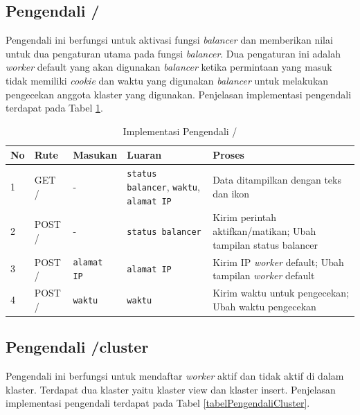 \documentclass{ta-its}
\begin{document}
			\subsection{Pengendali /}
				Pengendali ini berfungsi untuk aktivasi fungsi \textit{balancer} dan memberikan nilai untuk dua pengaturan utama pada fungsi \textit{balancer}. Dua pengaturan ini adalah \textit{worker} default yang akan digunakan \textit{balancer} ketika permintaan yang masuk tidak memiliki \textit{cookie} dan waktu yang digunakan \textit{balancer} untuk melakukan pengecekan anggota klaster yang digunakan. Penjelasan implementasi pengendali terdapat pada Tabel \ref{tabelPengendaliHome}.
				
				\begin{longtable}{|p{}|p{0.2\textwidth}|p{}|p{}|p{}|} %
					
					\caption{Implementasi Pengendali /} \label{tabelPengendaliHome} \\
					\hline
					\textbf{No} & \textbf{Rute} & \textbf{Masukan} & \textbf{Luaran} & \textbf{Proses} \\ \hline
					
					\endhead
					\endfoot
					\endlastfoot
					
					1 & GET / & - & \texttt{status balancer}, \texttt{waktu}, \texttt{alamat IP} & Data ditampilkan dengan teks dan ikon \\ \hline
					2 & POST / & - & \texttt{status balancer} & Kirim perintah aktifkan/matikan; Ubah tampilan status balancer \\ \hline
					3 & POST / & \texttt{alamat IP} & \texttt{alamat IP} & Kirim IP \textit{worker} default; Ubah tampilan \textit{worker} default \\ \hline
					4 & POST / & \texttt{waktu} & \texttt{waktu} & Kirim waktu untuk pengecekan; Ubah waktu pengecekan \\ \hline
					
				\end{longtable}
			
			\subsection{Pengendali /cluster}
				Pengendali ini berfungsi untuk mendaftar \textit{worker} aktif dan tidak aktif di dalam klaster. Terdapat dua klaster yaitu klaster view dan klaster insert. Penjelasan implementasi pengendali terdapat pada Tabel \ref{tabelPengendaliCluster}.
				
\end{document}
